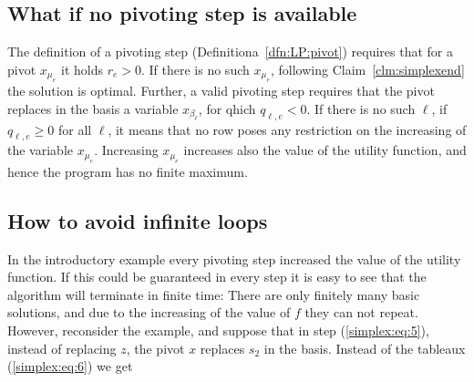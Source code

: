 \subsection*{What if no pivoting step is available}

\noindent
The definition of a pivoting step (Definitiona~\ref{dfn:LP:pivot}) requires that for a pivot 
 $x_{\mu_e}$ it holds $r_e>0$. If there is no such $x_{\mu_e}$, following Claim~\ref{clm:simplexend} 
the solution is optimal. Further, a valid pivoting step requires that the pivot replaces in the
basis a variable $x_{\beta_\ell}$, for qhich  $q_{\ell,e}<0$.
If there is no such $\ell$, \ie if $q_{\ell,e}\ge0$ for all $\ell$, it means that
no row poses any restriction on the increasing of the variable  $x_{\mu_e}$.
Increasing $x_{\mu_e}$ increases also the value of the utility function, and hence the program has no finite maximum.


\subsection*{How to avoid infinite loops}

\noindent
In the introductory example every pivoting step increased the value of the utility function.
If this could be guaranteed in every step it is easy to see that the algorithm will terminate in finite time:
There are only finitely many basic solutions, and due to the increasing of the value of $f$ they can not repeat.
However, reconsider the example, and suppose that in step (\ref{simplex:eq:5}), instead of 
replacing $z$, the pivot $x$ replaces $s_2$ in the basis. Instead of the tableaux (\ref{simplex:eq:6})
we get


